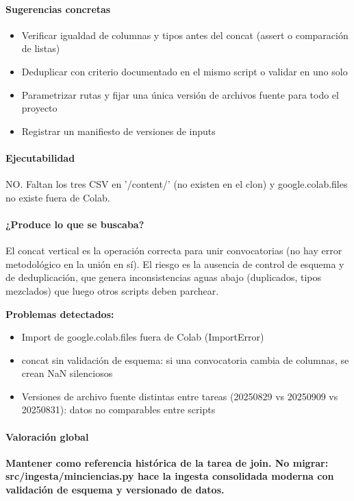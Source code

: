 \paragraph{Sugerencias concretas}
\begin{itemize}
  \item Verificar igualdad de columnas y tipos antes del concat (assert o comparación de listas)
  \item Deduplicar con criterio documentado en el mismo script o validar en uno solo
  \item Parametrizar rutas y fijar una única versión de archivos fuente para todo el proyecto
  \item Registrar un manifiesto de versiones de inputs
\end{itemize}

\paragraph{Ejecutabilidad}
NO. Faltan los tres CSV en '/content/' (no existen en el clon) y google.colab.files no existe fuera de Colab.

\paragraph{¿Produce lo que se buscaba?}
El concat vertical es la operación correcta para unir convocatorias (no hay error metodológico en la unión en sí). El riesgo es la ausencia de control de esquema y de deduplicación, que genera inconsistencias aguas abajo (duplicados, tipos mezclados) que luego otros scripts deben parchear.

\begin{tcolorbox}[riesgo]
\textbf{Problemas detectados:}
\begin{itemize}
  \item Import de google.colab.files fuera de Colab (ImportError)
  \item concat sin validación de esquema: si una convocatoria cambia de columnas, se crean NaN silenciosos
  \item Versiones de archivo fuente distintas entre tareas (20250829 vs 20250909 vs 20250831): datos no comparables entre scripts
\end{itemize}
\end{tcolorbox}

\paragraph{Valoración global}
\textbf{Mantener como referencia histórica de la tarea de join. No migrar: src/ingesta/minciencias.py hace la ingesta consolidada moderna con validación de esquema y versionado de datos.}

